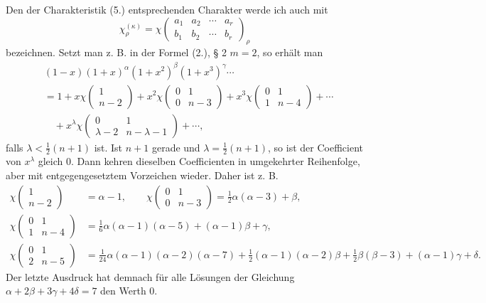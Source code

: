 \documentclass[11pt]{article}
\begin{document}
Den der Charakteristik (5.) entsprechenden Charakter werde ich auch mit
\[
 \chi_\rho^{(\kappa)}=\chi\left(\begin{matrix}a_1&a_2&\cdots&a_r\\ b_1&b_2&\cdots&b_r\end{matrix}\right)_\rho
\]
bezeichnen. Setzt man z. B. in der Formel (2.), § 2 $m=2$, so erhält man
\begin{equation}\tag{10.}
\begin{aligned}
 &(1-x)(1+x)^\alpha(1+x^2)^\beta(1+x^3)^\gamma\cdots\\
 &=1+x\chi\left(\begin{matrix}1\\ n-2\end{matrix}\right)
 +x^2\chi\left(\begin{matrix}0&1\\0&n-3\end{matrix}\right)
 +x^3\chi\left(\begin{matrix}0&1\\1&n-4\end{matrix}\right)+\cdots\\
 &\quad +x^\lambda\chi\left(\begin{matrix}0&1\\ \lambda-2&n-\lambda-1\end{matrix}\right)+\cdots,
\end{aligned}
\end{equation}
falls $\lambda<\frac12(n+1)$ ist. Ist $n+1$ gerade und $\lambda=\frac12(n+1)$, so ist der Coefficient von $x^\lambda$ gleich $0$. Dann kehren dieselben Coefficienten in umgekehrter Reihenfolge, aber mit entgegengesetztem Vorzeichen wieder. Daher ist z. B.
\begin{equation}\tag{11.}
\begin{aligned}
\chi\left(\begin{matrix}1\\ n-2\end{matrix}\right)&=\alpha-1,\qquad
\chi\left(\begin{matrix}0&1\\0&n-3\end{matrix}\right)=\frac12\alpha(\alpha-3)+\beta,\\
\chi\left(\begin{matrix}0&1\\1&n-4\end{matrix}\right)&=\frac16\alpha(\alpha-1)(\alpha-5)+(\alpha-1)\beta+
\gamma,\\
\chi\left(\begin{matrix}0&1\\2&n-5\end{matrix}\right)&=\frac1{24}\alpha(\alpha-1)(\alpha-2)(\alpha-7)
 +\frac12(\alpha-1)(\alpha-2)\beta+\frac12\beta(\beta-3)+(\alpha-1)\gamma+
\delta.
\end{aligned}
\end{equation}
Der letzte Ausdruck hat demnach für alle Lösungen der Gleichung $\alpha+2\beta+3\gamma+4\delta=7$ den Werth $0$.
\end{document}
